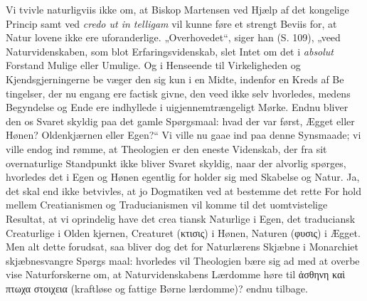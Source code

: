 \documentclass[12pt]{book}
\newcommand{\opage}[1]{\marginnote{\footnotesize\textit{[#1]}}}
\begin{document}
Vi tvivle naturligviis ikke om, at Biskop Martensen
ved Hjælp af det kongelige Princip samt ved \textit{credo ut in\-%
\opage{19}\setcounter{footnote}{0}%
telligam} vil kunne føre et strengt Beviis for, at Natur\-%
lovene ikke ere uforanderlige. „Overhovedet“, siger han (S.
109), „veed Naturvidenskaben, som blot Erfaringsvidenskab,
slet Intet om det i \emph{absolut} Forstand Mulige eller Umulige.
Og i Henseende til Virkeligheden og Kjendsgjerningerne be\-%
væger den sig kun i en Midte, indenfor en Kreds af Be\-%
tingelser, der nu engang ere factisk givne, den veed ikke selv
hvorledes, medens Begyndelse og Ende ere indhyllede i
uigjennemtrængeligt Mørke. Endnu bliver den os Svaret
skyldig paa det gamle Spørgsmaal: hvad der var først,
Ægget eller Hønen? Oldenkjærnen eller Egen?“ Vi ville
nu gaae ind paa denne Synsmaade; vi ville endog ind\-%
rømme, at Theologien er den eneste Videnskab, der fra sit
overnaturlige Standpunkt ikke bliver Svaret skyldig, naar der
alvorlig spørges, hvorledes det i Egen og Hønen egentlig for\-%
holder sig med Skabelse og Natur. Ja, det skal end ikke
betvivles, at jo Dogmatiken ved at bestemme det rette For\-%
hold mellem Creatianismen og Traducianismen vil komme
til det uomtvistelige Resultat, at vi oprindelig have det crea\-%
tiansk Naturlige i Egen, det traduciansk Creaturlige i Olden\-%
kjernen, Creaturet (κτισις) i Hønen, Naturen (φυσις) i
Ægget. %
Men alt dette forudsat, saa bliver dog det for
Naturlærens Skjæbne i Monarchiet skjæbnesvangre Spørgs\-%
maal: hvorledes vil Theologien bære sig ad med at overbe\-%
vise Naturforskerne om, at Naturvidenskabens Lærdomme høre
til ἀσθηνη καὶ πτωχα στοιχεια %
(kraftløse og fattige Børne\-%
lærdomme)? endnu tilbage.
\end{document}
